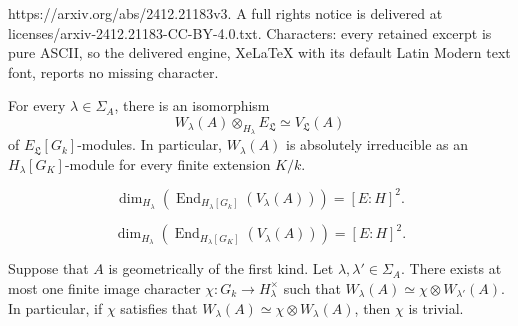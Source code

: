 \documentclass[10pt,a4paper]{amsart}
\newcommand{\End}{\operatorname{End}}
\newcommand{\Ll}{\mathfrak{L}}
\begin{document}
https://arxiv.org/abs/2412.21183v3. A full rights notice is delivered at licenses/arxiv-2412.21183-CC-BY-4.0.txt. Characters: every retained excerpt is pure ASCII, so the delivered engine, XeLaTeX with its default Latin Modern text font, reports no missing character.
\begin{lemma}\label{lemma: realVL} For every $\lambda \in \Sigma_A$, there is an isomorphism
$$
W_\lambda(A) \otimes_{H_\lambda}E_{\Ll}\simeq V_{\Ll}(A)
$$
 of $E_{\Ll}[G_k]$-modules. In particular, $W_\lambda(A)$ is absolutely irreducible as an $H_\lambda[G_K]$-module for every finite extension $K/k$.
\end{lemma}

\begin{equation}\label{equation: dimendk}
\dim_{H_\lambda}(\End_{H_\lambda[G_k]}(V_\lambda(A)))=[E:H]^2.
\end{equation}

\begin{equation}\label{equation: HlambdaEnd}
\dim_{H_\lambda}(\End_{H_\lambda[G_K]}(V_\lambda(A)))=[E:H]^2.
\end{equation}

\begin{lemma}\label{lemma: unique}
Suppose that $A$ is geometrically of the first kind. Let $\lambda,\lambda'\in \Sigma_A$. There exists at most one finite image character $\chi \colon G_k\rightarrow H_\lambda^ \times$ such that $W_\lambda(A)\simeq \chi\otimes W_{\lambda'} (A)$. In particular, if $\chi$ satisfies that $W_\lambda(A) \simeq \chi \otimes W_\lambda (A)$, then $\chi$ is trivial.
\end{lemma}
\end{document}
